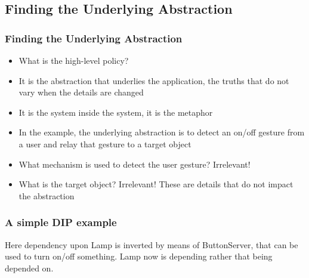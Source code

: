 \documentclass{beamer}
\begin{document}
\subsection{Finding the Underlying Abstraction}
\begin{frame}
  \frametitle{Finding the Underlying Abstraction}
  \begin{itemize}
	\item<+-> What is the high-level policy? 
	\item<+-> It is the abstraction that underlies the application, the truths that do not vary when the details are changed
	\item<+-> It is the system inside the system, it is the metaphor
	\item<+-> In the example, the underlying abstraction is to detect an on/off gesture from a user and relay that gesture to a target object
	\item<+->  What mechanism is used to detect the user gesture? Irrelevant! 
	\item<+->  What is the target object? Irrelevant! These are details that do not impact the abstraction
   \end{itemize}
\end{frame}

\begin{frame}
	\frametitle{A simple DIP example}
	Here dependency upon Lamp is inverted by means of ButtonServer,  that can be used to turn on/off something. Lamp now is depending rather that being depended on.
	\begin{center}
	\end{center}
\end{frame}
\end{document}
